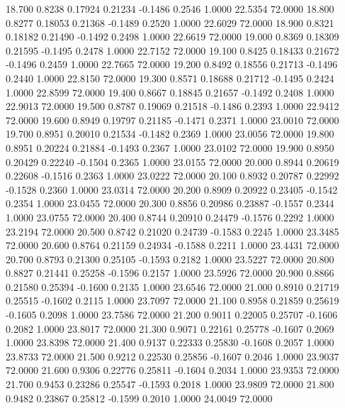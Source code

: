   18.700   0.8238   0.17924   0.21234  -0.1486   0.2546   1.0000  22.5354  72.0000
  18.800   0.8277   0.18053   0.21368  -0.1489   0.2520   1.0000  22.6029  72.0000
  18.900   0.8321   0.18182   0.21490  -0.1492   0.2498   1.0000  22.6619  72.0000
  19.000   0.8369   0.18309   0.21595  -0.1495   0.2478   1.0000  22.7152  72.0000
  19.100   0.8425   0.18433   0.21672  -0.1496   0.2459   1.0000  22.7665  72.0000
  19.200   0.8492   0.18556   0.21713  -0.1496   0.2440   1.0000  22.8150  72.0000
  19.300   0.8571   0.18688   0.21712  -0.1495   0.2424   1.0000  22.8599  72.0000
  19.400   0.8667   0.18845   0.21657  -0.1492   0.2408   1.0000  22.9013  72.0000
  19.500   0.8787   0.19069   0.21518  -0.1486   0.2393   1.0000  22.9412  72.0000
  19.600   0.8949   0.19797   0.21185  -0.1471   0.2371   1.0000  23.0010  72.0000
  19.700   0.8951   0.20010   0.21534  -0.1482   0.2369   1.0000  23.0056  72.0000
  19.800   0.8951   0.20224   0.21884  -0.1493   0.2367   1.0000  23.0102  72.0000
  19.900   0.8950   0.20429   0.22240  -0.1504   0.2365   1.0000  23.0155  72.0000
  20.000   0.8944   0.20619   0.22608  -0.1516   0.2363   1.0000  23.0222  72.0000
  20.100   0.8932   0.20787   0.22992  -0.1528   0.2360   1.0000  23.0314  72.0000
  20.200   0.8909   0.20922   0.23405  -0.1542   0.2354   1.0000  23.0455  72.0000
  20.300   0.8856   0.20986   0.23887  -0.1557   0.2344   1.0000  23.0755  72.0000
  20.400   0.8744   0.20910   0.24479  -0.1576   0.2292   1.0000  23.2194  72.0000
  20.500   0.8742   0.21020   0.24739  -0.1583   0.2245   1.0000  23.3485  72.0000
  20.600   0.8764   0.21159   0.24934  -0.1588   0.2211   1.0000  23.4431  72.0000
  20.700   0.8793   0.21300   0.25105  -0.1593   0.2182   1.0000  23.5227  72.0000
  20.800   0.8827   0.21441   0.25258  -0.1596   0.2157   1.0000  23.5926  72.0000
  20.900   0.8866   0.21580   0.25394  -0.1600   0.2135   1.0000  23.6546  72.0000
  21.000   0.8910   0.21719   0.25515  -0.1602   0.2115   1.0000  23.7097  72.0000
  21.100   0.8958   0.21859   0.25619  -0.1605   0.2098   1.0000  23.7586  72.0000
  21.200   0.9011   0.22005   0.25707  -0.1606   0.2082   1.0000  23.8017  72.0000
  21.300   0.9071   0.22161   0.25778  -0.1607   0.2069   1.0000  23.8398  72.0000
  21.400   0.9137   0.22333   0.25830  -0.1608   0.2057   1.0000  23.8733  72.0000
  21.500   0.9212   0.22530   0.25856  -0.1607   0.2046   1.0000  23.9037  72.0000
  21.600   0.9306   0.22776   0.25811  -0.1604   0.2034   1.0000  23.9353  72.0000
  21.700   0.9453   0.23286   0.25547  -0.1593   0.2018   1.0000  23.9809  72.0000
  21.800   0.9482   0.23867   0.25812  -0.1599   0.2010   1.0000  24.0049  72.0000
